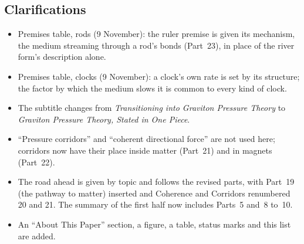 \documentclass[11pt,a4paper]{article}
\begin{document}
\subsection*{Clarifications}
\begin{itemize}
\item Premises table, rods (9 November): the ruler premise is given its mechanism, the medium streaming through a rod's bonds (Part~23), in place of the river form's description alone.
\item Premises table, clocks (9 November): a clock's own rate is set by its structure; the factor by which the medium slows it is common to every kind of clock.
\item The subtitle changes from \emph{Transitioning into Graviton Pressure Theory} to \emph{Graviton Pressure Theory, Stated in One Piece}.
\item ``Pressure corridors'' and ``coherent directional force'' are not used here; corridors now have their place inside matter (Part~21) and in magnets (Part~22).
\item The road ahead is given by topic and follows the revised parts, with Part~19 (the pathway to matter) inserted and Coherence and Corridors renumbered 20 and 21. The summary of the first half now includes Parts~5 and~8 to~10.
\item An ``About This Paper'' section, a figure, a table, status marks and this list are added.
\end{itemize}

\newpage


\end{document}
